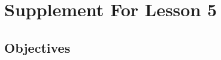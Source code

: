 \documentclass{article}
\begin{document}
\newfontfamily{}
\newfontfamily{}
\newcommand{\bul}{\hfil$\bullet$&}
\renewenvironment{glossary}{\begin{multicols}{5}\begin{center}}{\end{center}\end{multicols}}
\setcounter{secnumdepth}{0}
\setlength{\columnseprule}{1pt}

\section{Supplement For Lesson 5}

\subsection{Objectives}
\end{document}
